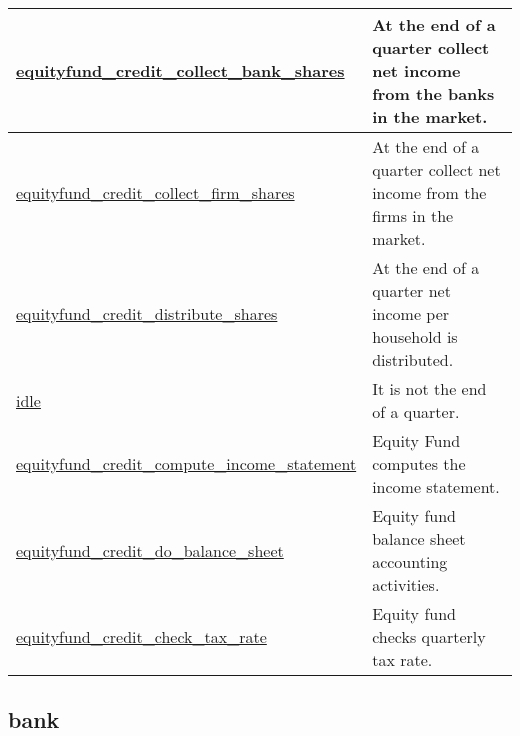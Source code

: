 \documentclass[a4paper,11pt]{article}
\begin{document}
\begin{landscape}
\begin{longtable}[H!]{ll}
\url{equityfund_credit_collect_bank_shares} \index{\url{equityfund_credit_collect_bank_shares}} & \parbox{10cm}{At the end of a quarter collect net income from the banks in the market.} \\
\midrule
\url{equityfund_credit_collect_firm_shares}  & \parbox{10cm}{At the end of a quarter collect net income from the firms in the market.} \\
\midrule
\url{equityfund_credit_distribute_shares}  & \parbox{10cm}{At the end of a quarter net income per household is distributed.} \\
\midrule
\url{idle}  & \parbox{10cm}{It is not the end of a quarter.} \\
\midrule
\url{equityfund_credit_compute_income_statement}  & \parbox{10cm}{Equity Fund computes the income statement.} \\
\midrule
\url{equityfund_credit_do_balance_sheet}  & \parbox{10cm}{Equity fund balance sheet accounting activities.} \\
\midrule
\url{equityfund_credit_check_tax_rate}  & \parbox{10cm}{Equity fund checks quarterly tax rate.} \\
\end{longtable}
\end{landscape}



\clearpage
\subsection{bank}
\end{document}
